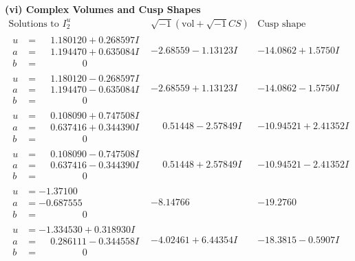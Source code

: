 \documentclass[1p]{elsarticle_modified}
\theoremstyle{definition}
\newcommand{\I}{\sqrt{-1}}
\begin{document}
\newpage\flushleft \textbf{(vi) Complex Volumes and Cusp Shapes}
$$\begin{array}{c|c|c}  
\text{Solutions to }I^u_{2}& \I (\text{vol} + \sqrt{-1}CS) & \text{Cusp shape}\\
 \hline 
\begin{aligned}
u &= \phantom{-}1.180120 + 0.268597 I \\
a &= \phantom{-}1.194470 + 0.635084 I \\
b &= \phantom{-0.000000 } 0\end{aligned}
 & -2.68559 - 1.13123 I & -14.0862 + 1.5750 I \\ \hline\begin{aligned}
u &= \phantom{-}1.180120 - 0.268597 I \\
a &= \phantom{-}1.194470 - 0.635084 I \\
b &= \phantom{-0.000000 } 0\end{aligned}
 & -2.68559 + 1.13123 I & -14.0862 - 1.5750 I \\ \hline\begin{aligned}
u &= \phantom{-}0.108090 + 0.747508 I \\
a &= \phantom{-}0.637416 + 0.344390 I \\
b &= \phantom{-0.000000 } 0\end{aligned}
 & \phantom{-}0.51448 - 2.57849 I & -10.94521 + 2.41352 I \\ \hline\begin{aligned}
u &= \phantom{-}0.108090 - 0.747508 I \\
a &= \phantom{-}0.637416 - 0.344390 I \\
b &= \phantom{-0.000000 } 0\end{aligned}
 & \phantom{-}0.51448 + 2.57849 I & -10.94521 - 2.41352 I \\ \hline\begin{aligned}
u &= -1.37100\phantom{ +0.000000I} \\
a &= -0.687555\phantom{ +0.000000I} \\
b &= \phantom{-0.000000 } 0\end{aligned}
 & -8.14766\phantom{ +0.000000I} & -19.2760\phantom{ +0.000000I} \\ \hline\begin{aligned}
u &= -1.334530 + 0.318930 I \\
a &= \phantom{-}0.286111 - 0.344558 I \\
b &= \phantom{-0.000000 } 0\end{aligned}
 & -4.02461 + 6.44354 I & -18.3815 - 0.5907 I \\ \hline\begin{aligned}

\end{aligned}
\end{array}$$
\end{document}
